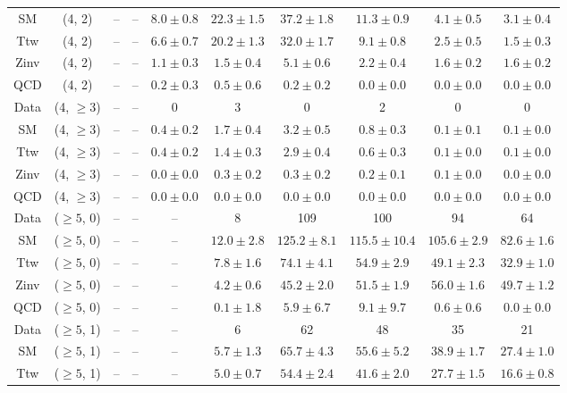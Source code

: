 \begin{table}[h!]
{\begin{tabular}{cccccccccc}
	SM & (4, 2) & -- & -- & $8.0\pm 0.8$ & $22.3\pm 1.5$ & $37.2\pm 1.8$ & $11.3\pm 0.9$ & $4.1\pm 0.5$ & $3.1\pm 0.4$ \\[0.5ex] 
	Ttw & (4, 2) & -- & -- & $6.6\pm 0.7$ & $20.2\pm 1.3$ & $32.0\pm 1.7$ & $9.1\pm 0.8$ & $2.5\pm 0.5$ & $1.5\pm 0.3$ \\[0.5ex] 
	Zinv & (4, 2) & -- & -- & $1.1\pm 0.3$ & $1.5\pm 0.4$ & $5.1\pm 0.6$ & $2.2\pm 0.4$ & $1.6\pm 0.2$ & $1.6\pm 0.2$ \\[0.5ex] 
	QCD & (4, 2) & -- & -- & $0.2\pm 0.3$ & $0.5\pm 0.6$ & $0.2\pm 0.2$ & $0.0\pm 0.0$ & $0.0\pm 0.0$ & $0.0\pm 0.0$ \\[0.5ex] 
	Data & (4, $\ge3$) & -- & -- & 0 & 3 & 0 & 2 & 0 & 0 \\[0.5ex] 
	SM & (4, $\ge3$) & -- & -- & $0.4\pm 0.2$ & $1.7\pm 0.4$ & $3.2\pm 0.5$ & $0.8\pm 0.3$ & $0.1\pm 0.1$ & $0.1\pm 0.0$ \\[0.5ex] 
	Ttw & (4, $\ge3$) & -- & -- & $0.4\pm 0.2$ & $1.4\pm 0.3$ & $2.9\pm 0.4$ & $0.6\pm 0.3$ & $0.1\pm 0.0$ & $0.1\pm 0.0$ \\[0.5ex] 
	Zinv & (4, $\ge3$) & -- & -- & $0.0\pm 0.0$ & $0.3\pm 0.2$ & $0.3\pm 0.2$ & $0.2\pm 0.1$ & $0.1\pm 0.0$ & $0.0\pm 0.0$ \\[0.5ex] 
	QCD & (4, $\ge3$) & -- & -- & $0.0\pm 0.0$ & $0.0\pm 0.0$ & $0.0\pm 0.0$ & $0.0\pm 0.0$ & $0.0\pm 0.0$ & $0.0\pm 0.0$ \\[0.5ex] 
	Data & ($\ge5$, 0) & -- & -- & -- & 8 & 109 & 100 & 94 & 64 \\[0.5ex] 
	SM & ($\ge5$, 0) & -- & -- & -- & $12.0\pm 2.8$ & $125.2\pm 8.1$ & $115.5\pm 10.4$ & $105.6\pm 2.9$ & $82.6\pm 1.6$ \\[0.5ex] 
	Ttw & ($\ge5$, 0) & -- & -- & -- & $7.8\pm 1.6$ & $74.1\pm 4.1$ & $54.9\pm 2.9$ & $49.1\pm 2.3$ & $32.9\pm 1.0$ \\[0.5ex] 
	Zinv & ($\ge5$, 0) & -- & -- & -- & $4.2\pm 0.6$ & $45.2\pm 2.0$ & $51.5\pm 1.9$ & $56.0\pm 1.6$ & $49.7\pm 1.2$ \\[0.5ex] 
	QCD & ($\ge5$, 0) & -- & -- & -- & $0.1\pm 1.8$ & $5.9\pm 6.7$ & $9.1\pm 9.7$ & $0.6\pm 0.6$ & $0.0\pm 0.0$ \\[0.5ex] 
	Data & ($\ge5$, 1) & -- & -- & -- & 6 & 62 & 48 & 35 & 21 \\[0.5ex] 
	SM & ($\ge5$, 1) & -- & -- & -- & $5.7\pm 1.3$ & $65.7\pm 4.3$ & $55.6\pm 5.2$ & $38.9\pm 1.7$ & $27.4\pm 1.0$ \\[0.5ex] 
	Ttw & ($\ge5$, 1) & -- & -- & -- & $5.0\pm 0.7$ & $54.4\pm 2.4$ & $41.6\pm 2.0$ & $27.7\pm 1.5$ & $16.6\pm 0.8$ \\[0.5ex] 

\end{tabular}}
\end{table}
